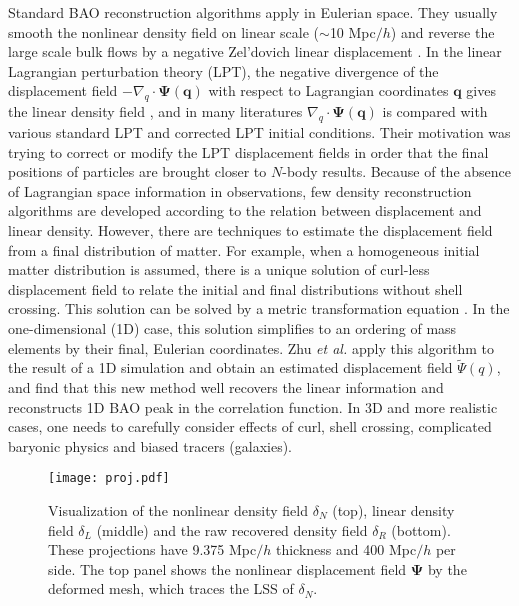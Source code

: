 \documentclass[aps,prd,twocolumn,superscriptaddress,amsfont,amssymb,amsmath,nofootinbib,showpacs,balancelastpage]{revtex4-1}
\newcommand{\bs}{\boldsymbol}
\begin{document}
Standard BAO reconstruction algorithms apply in Eulerian space.
They usually smooth the nonlinear density field on
linear scale ($\sim$10 Mpc$/h$) and reverse the large
scale bulk flows by a negative Zel'dovich linear displacement
\citep{2007ApJ...664..675E,2009PhRvD..80l3501N,2009PhRvD..79f3523P}.
In the linear Lagrangian perturbation theory (LPT), the
negative divergence of the displacement field
$-\nabla_q\cdot\bs\Psi(\bs q)$ with respect to Lagrangian coordinates $\bs q$
gives the linear density field \citep{2010PhDT.........4J},
and in many literatures
\cite{2013MNRAS.428..141N,2014PhRvD..89h3515C,2016JCAP...03..017B}
$\nabla_q\cdot\bs\Psi(\bs q)$ is compared with various standard LPT
and corrected LPT initial conditions. Their motivation was
trying to correct or modify the LPT displacement fields
in order that the final positions of particles are brought
closer to $N$-body results. Because of the absence
of Lagrangian space information in observations, few density
reconstruction algorithms are developed according to the relation
between displacement and linear density. However,
there are techniques to estimate the displacement field from a final
distribution of matter.
For example, when a homogeneous initial matter distribution
is assumed, there is a unique solution of curl-less displacement field to relate
the initial and final distributions without shell crossing. This solution can be
solved by a metric transformation equation
\citep{1995ApJS..100..269P,1998ApJS..115...19P}.
In the one-dimensional (1D) case, this solution
simplifies to an ordering of mass elements by their final, Eulerian coordinates.
Zhu {\it et al.} \cite{2016arXiv160907041Z} apply this algorithm to the result
of a 1D simulation \citep{2016JCAP...01..043M} and obtain an estimated
displacement field $\tilde\Psi(q)$, and find
that this new method well recovers the linear
information and reconstructs 1D BAO peak in the correlation function.
In 3D and more realistic cases, one needs to
carefully consider effects of curl, shell crossing,
complicated baryonic physics and biased tracers (galaxies).

\begin{figure}
 \centering
  \texttt{[image: proj.pdf]}
  \caption{Visualization of the nonlinear density field $\delta_N$ (top),
  linear density field $\delta_L$ (middle) and the raw recovered density
  field $\delta_R$ (bottom). These projections have 9.375 Mpc$/h$ thickness
  and 400 Mpc$/h$ per side. The top panel shows the nonlinear displacement
  field $\bs\Psi$ by the deformed mesh, which traces the LSS of $\delta_N$.}
  \label{fig.projection}
\end{figure}
\end{document}

